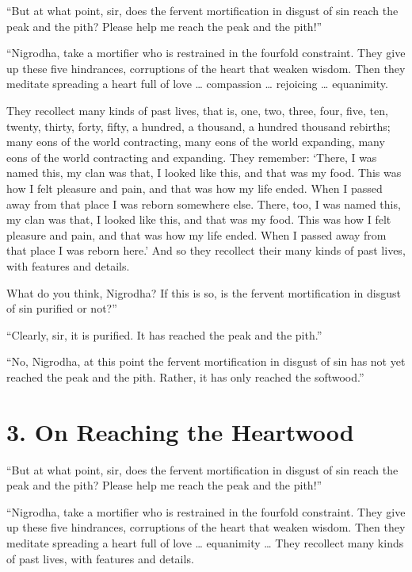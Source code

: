\documentclass[12pt,openany]{book}%
\begin{document}
“But at what point, sir, does the fervent mortification in disgust of sin reach the peak and the pith? Please help me reach the peak and the pith!” 

“Nigrodha, take a mortifier who is restrained in the fourfold constraint. They give up these five hindrances, corruptions of the heart that weaken wisdom. Then they meditate spreading a heart full of love … compassion … rejoicing … equanimity. 

They recollect many kinds of past lives, that is, one, two, three, four, five, ten, twenty, thirty, forty, fifty, a hundred, a thousand, a hundred thousand rebirths; many eons of the world contracting, many eons of the world expanding, many eons of the world contracting and expanding. They remember: ‘There, I was named this, my clan was that, I looked like this, and that was my food. This was how I felt pleasure and pain, and that was how my life ended. When I passed away from that place I was reborn somewhere else. There, too, I was named this, my clan was that, I looked like this, and that was my food. This was how I felt pleasure and pain, and that was how my life ended. When I passed away from that place I was reborn here.’ And so they recollect their many kinds of past lives, with features and details. 

What do you think, Nigrodha? If this is so, is the fervent mortification in disgust of sin purified or not?” 

“Clearly, sir, it is purified. It has reached the peak and the pith.” 

“No, Nigrodha, at this point the fervent mortification in disgust of sin has not yet reached the peak and the pith. Rather, it has only reached the softwood.” 

\section*{3. On Reaching the Heartwood }

“But at what point, sir, does the fervent mortification in disgust of sin reach the peak and the pith? Please help me reach the peak and the pith!” 

“Nigrodha, take a mortifier who is restrained in the fourfold constraint. They give up these five hindrances, corruptions of the heart that weaken wisdom. Then they meditate spreading a heart full of love … equanimity … They recollect many kinds of past lives, with features and details. 
\end{document}
